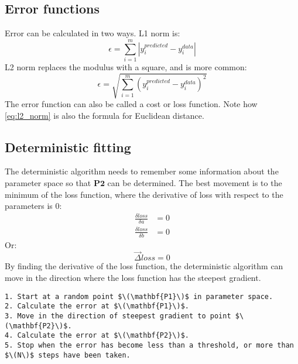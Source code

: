 \subsection{Error functions}
Error can be calculated in two ways. L1 norm is:
\begin{equation*}
    \epsilon = \sum_{i=1}^{m}|y_i^{predicted} - y_i^{data}|
\end{equation*}
L2 norm replaces the modulus with a square, and is more common:
\begin{equation}
    \label{eq:l2_norm}
    \epsilon = \sqrt{\sum_{i=1}^{m}(y_i^{predicted} - y_i^{data})^2}
\end{equation}
The error function can also be called a cost or loss function. Note how \ref*{eq:l2_norm} is also the formula for Euclidean distance.

\subsection{Deterministic fitting}
The deterministic algorithm needs to remember some information about the parameter space so that \(\mathbf{P2}\) can be determined. The best movement is to the minimum of the loss function, where the derivative of loss with respect to the parameters is 0:
\begin{align*}
    \frac{\delta loss}{\delta a} & = 0 \\
    \frac{\delta loss}{\delta b} & = 0
\end{align*}
Or:
\begin{equation*}
    \vec{\Delta} loss = 0
\end{equation*}
By finding the derivative of the loss function, the deterministic algorithm can move in the direction where the loss function has the steepest gradient.

\begin{lstlisting}
1. Start at a random point $\(\mathbf{P1}\)$ in parameter space.
2. Calculate the error at $\(\mathbf{P1}\)$.
3. Move in the direction of steepest gradient to point $\(\mathbf{P2}\)$.
4. Calculate the error at $\(\mathbf{P2}\)$.
5. Stop when the error has become less than a threshold, or more than $\(N\)$ steps have been taken.
\end{lstlisting}
